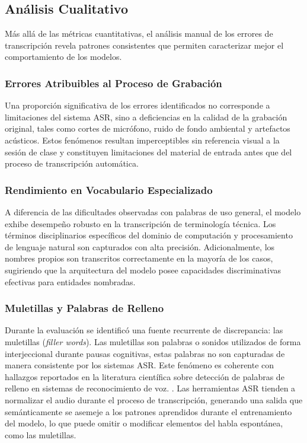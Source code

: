 \subsection{Análisis Cualitativo}

Más allá de las métricas cuantitativas, el análisis manual de los errores de transcripción revela patrones consistentes que permiten caracterizar mejor el comportamiento de los modelos.

\subsubsection{Errores Atribuibles al Proceso de Grabación}

Una proporción significativa de los errores identificados no corresponde a limitaciones del sistema ASR, sino a deficiencias en la calidad de la grabación original, tales como cortes de micrófono, ruido de fondo ambiental y artefactos acústicos. Estos fenómenos resultan imperceptibles sin referencia visual a la sesión de clase y constituyen limitaciones del material de entrada antes que del proceso de transcripción automática.

\subsubsection{Rendimiento en Vocabulario Especializado}

A diferencia de las dificultades observadas con palabras de uso general, el modelo exhibe desempeño robusto en la transcripción de terminología técnica. Los términos disciplinarios específicos del dominio de computación y procesamiento de lenguaje natural son capturados con alta precisión. Adicionalmente, los nombres propios son transcritos correctamente en la mayoría de los casos, sugiriendo que la arquitectura del modelo posee capacidades discriminativas efectivas para entidades nombradas.

\subsubsection{Muletillas y Palabras de Relleno}

Durante la evaluación se identificó una fuente recurrente de discrepancia: las muletillas (\textit{filler words}). Las muletillas son palabras o sonidos utilizados de forma interjeccional durante pausas cognitivas, estas palabras no son capturadas de manera consistente por los sistemas ASR. Este fenómeno es coherente con hallazgos reportados en la literatura científica sobre detección de palabras de relleno en sistemas de reconocimiento de voz. \cite{zhu2022fillerworddetectionclassification}. Las herramientas ASR tienden a normalizar el audio durante el proceso de transcripción, generando una salida que semánticamente se asemeje a los patrones aprendidos durante el entrenamiento del modelo, lo que puede omitir o modificar elementos del habla espontánea, como las muletillas.

